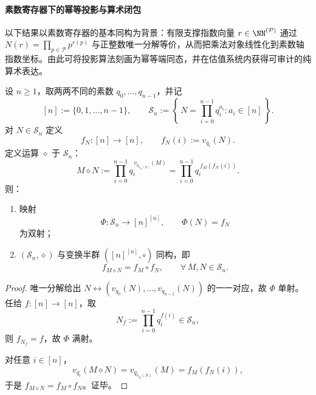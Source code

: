 \paragraph{素数寄存器下的幂等投影与算术闭包}
以下结果以素数寄存器的基本同构为背景：有限支撑指数向量
\(
r\in\NN^{(\mathcal P)}
\)
通过
\(
N(r)=\prod_{p\in\mathcal P}p^{r(p)}
\)
与正整数唯一分解等价，从而把乘法对象线性化到素数轴指数坐标。由此可将投影算法刻画为幂等端同态，并在估值系统内获得可审计的纯算术表达。

\begin{theorem}[有限算法半群的素数估值算术化与自指合成律]\label{thm:killo-finite-semigroup-prime-valuation-arithmetization}
设 \(n\ge 1\)，取两两不同的素数 \(q_0,\dots,q_{n-1}\)，并记
\[
[n]:=\{0,1,\dots,n-1\},
\qquad
\mathcal S_n:=\left\{\,N=\prod_{i=0}^{n-1}q_i^{a_i}:a_i\in[n]\,\right\}.
\]
对 \(N\in\mathcal S_n\) 定义
\[
f_N:[n]\to[n],\qquad f_N(i):=v_{q_i}(N).
\]
定义运算 \(\diamond\) 于 \(\mathcal S_n\)：
\[
M\diamond N:=\prod_{i=0}^{n-1}q_i^{\,v_{q_{v_{q_i}(N)}}(M)}
=\prod_{i=0}^{n-1}q_i^{\,f_M(f_N(i))}.
\]
则：
\begin{enumerate}
  \item 映射
  \[
  \Phi:\mathcal S_n\to [n]^{[n]},\qquad \Phi(N)=f_N
  \]
  为双射；
  \item \((\mathcal S_n,\diamond)\) 与变换半群 \(([n]^{[n]},\circ)\) 同构，即
  \[
  f_{M\diamond N}=f_M\circ f_N,\qquad \forall\,M,N\in\mathcal S_n.
  \]
\end{enumerate}
\end{theorem}
\begin{proof}
唯一分解给出
\(
N\leftrightarrow (v_{q_0}(N),\dots,v_{q_{n-1}}(N))
\)
的一一对应，故 \(\Phi\) 单射。任给 \(f:[n]\to[n]\)，取
\[
N_f:=\prod_{i=0}^{n-1}q_i^{f(i)}\in\mathcal S_n,
\]
则 \(f_{N_f}=f\)，故 \(\Phi\) 满射。

对任意 \(i\in[n]\)，
\[
v_{q_i}(M\diamond N)=v_{q_{v_{q_i}(N)}}(M)=f_M(f_N(i)),
\]
于是 \(f_{M\diamond N}=f_M\circ f_N\)。证毕。
\end{proof}

